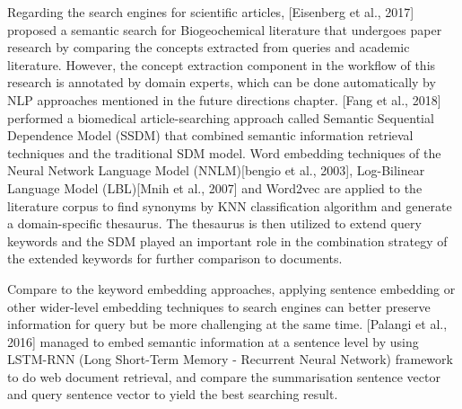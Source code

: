 Regarding the search engines for scientific articles, [Eisenberg et al., 2017] proposed a semantic search for Biogeochemical literature that undergoes paper research by comparing the concepts extracted from queries and academic literature.
However, the concept extraction component in the workflow of this research is annotated by domain experts, which can be done automatically by NLP approaches mentioned in the future directions chapter.
[Fang et al., 2018] performed a biomedical article-searching approach called Semantic Sequential Dependence Model (SSDM) that combined semantic information retrieval techniques and the traditional SDM model.
Word embedding techniques of the Neural Network Language Model (NNLM)[bengio et al., 2003], Log-Bilinear Language Model (LBL)[Mnih et al., 2007] and Word2vec are applied to the literature corpus to find synonyms by KNN classification algorithm and generate a domain-specific thesaurus.
The thesaurus is then utilized to extend query keywords and the SDM played an important role in the combination strategy of the extended keywords for further comparison to documents.

Compare to the keyword embedding approaches, applying sentence embedding or other wider-level embedding techniques to search engines can better preserve information for query but be more challenging at the same time.
[Palangi et al., 2016] managed to embed semantic information at a sentence level by using LSTM-RNN (Long Short-Term Memory - Recurrent Neural Network) framework to do web document retrieval, and compare the summarisation sentence vector and query sentence vector to yield the best searching result.

